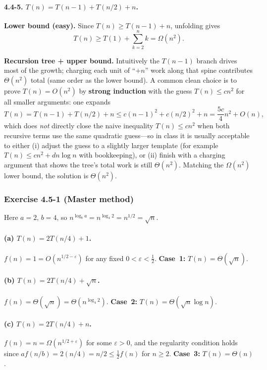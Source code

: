 \documentclass{article}
\theoremstyle{theorem}
\theoremstyle{definition}
\theoremstyle{remark}
\begin{document}
\paragraph{4.4-5. $T(n)=T(n-1)+T(n/2)+n$.}
\textbf{Lower bound (easy).} Since $T(n)\ge T(n-1)+n$, unfolding gives
\[
T(n)\ge T(1)+\sum_{k=2}^{n} k = \Omega(n^2).
\]

\textbf{Recursion tree + upper bound.} Intuitively the $T(n-1)$ branch drives most of the growth; charging each unit of ``$+n$'' work along that spine contributes $\Theta(n^2)$ total (same order as the lower bound). A common clean choice is to prove $T(n)=O(n^2)$ by \textbf{strong induction} with the guess $T(n)\le c n^2$ for all smaller arguments: one expands
\[
T(n)=T(n-1)+T(n/2)+n
\le c(n-1)^2 + c(n/2)^2 + n
= \frac{5c}{4}n^2 + O(n),
\]
which does \emph{not} directly close the naive inequality $T(n)\le c n^2$ when both recursive terms use the same quadratic guess---so in class it is usually acceptable to either (i) adjust the guess to a slightly larger template (for example $T(n)\le c n^2 + d n\log n$ with bookkeeping), or (ii) finish with a charging argument that shows the tree's total work is still $\Theta(n^2)$. Matching the $\Omega(n^2)$ lower bound, the solution is $\Theta(n^2)$.

\subsubsection*{Exercise 4.5-1 (Master method)}

Here $a=2$, $b=4$, so $n^{\log_b a}=n^{\log_4 2}=n^{1/2}=\sqrt{n}$.

\paragraph{(a) $T(n)=2T(n/4)+1$.}
$f(n)=1=O(n^{1/2-\varepsilon})$ for any fixed $0<\varepsilon<\tfrac12$. \textbf{Case~1:} $T(n)=\Theta(\sqrt{n})$.

\paragraph{(b) $T(n)=2T(n/4)+\sqrt{n}$.}
$f(n)=\Theta(\sqrt{n})=\Theta(n^{\log_4 2})$. \textbf{Case~2:} $T(n)=\Theta(\sqrt{n}\log n)$.

\paragraph{(c) $T(n)=2T(n/4)+n$.}
$f(n)=n=\Omega(n^{1/2+\varepsilon})$ for some $\varepsilon>0$, and the regularity condition holds since $af(n/b)=2(n/4)=n/2\le \tfrac12 f(n)$ for $n\ge 2$. \textbf{Case~3:} $T(n)=\Theta(n)$.
\end{document}
